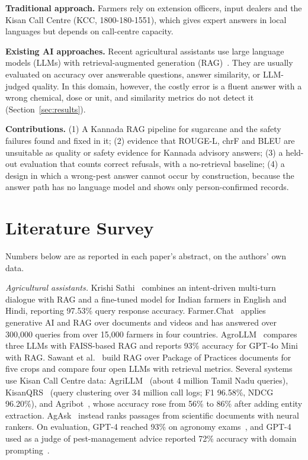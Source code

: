 \documentclass[conference]{IEEEtran}
\begin{document}
\textbf{Traditional approach.} Farmers rely on extension officers, input dealers and the
Kisan Call Centre (KCC, 1800-180-1551), which gives expert answers in local languages but
depends on call-centre capacity.

\textbf{Existing AI approaches.} Recent agricultural assistants use large language models
(LLMs) with retrieval-augmented generation (RAG)~\cite{lewis2020rag,vijayvargia2025krishisathi,singh2024farmerchat,samuel2025agrollm}.
They are usually evaluated on accuracy over answerable questions, answer similarity, or
LLM-judged quality. In this domain, however, the
costly error is a fluent answer with a wrong chemical, dose or unit, and similarity metrics
do not detect it (Section~\ref{sec:results}).

\textbf{Contributions.} (1) A Kannada RAG pipeline for sugarcane and the safety failures
found and fixed in it; (2) evidence that ROUGE-L, chrF and BLEU are unsuitable as quality or
safety evidence for Kannada advisory answers; (3) a held-out evaluation that counts correct
refusals, with a no-retrieval baseline; (4) a design in which a wrong-pest answer cannot
occur by construction, because the answer path has no language model and shows only
person-confirmed records.

\section{Literature Survey}
Numbers below are as reported in each paper's abstract, on the authors' own data.

\textit{Agricultural assistants.} Krishi Sathi~\cite{vijayvargia2025krishisathi} combines an
intent-driven multi-turn dialogue with RAG and a fine-tuned model for Indian farmers in
English and Hindi, reporting 97.53\% query response accuracy. Farmer.Chat~\cite{singh2024farmerchat}
applies generative AI and RAG over documents and videos and has answered over 300,000
queries from over 15,000 farmers in four countries. AgroLLM~\cite{samuel2025agrollm} compares
three LLMs with FAISS-based RAG and reports 93\% accuracy for GPT-4o Mini with RAG. Sawant
et al.~\cite{sawant2026empowering} build RAG over Package of Practices documents for five
crops and compare four open LLMs with retrieval metrics. Several systems use Kisan Call
Centre data: AgriLLM~\cite{didwania2024agrillm} (about 4 million Tamil Nadu queries),
KisanQRS~\cite{rehman2024kisanqrs} (query clustering over 34 million call logs; F1 96.58\%,
NDCG 96.20\%), and Agribot~\cite{jain2025agribot}, whose accuracy rose from 56\% to 86\%
after adding entity extraction. AgAsk~\cite{koopman2022agask} instead ranks passages from
scientific documents with neural rankers. On evaluation, GPT-4 reached 93\% on agronomy
exams~\cite{silva2023gpt4agronomist}, and GPT-4 used as a judge of pest-management advice
reported 72\% accuracy with domain prompting~\cite{yang2024gpt4evaluator}.
\end{document}
